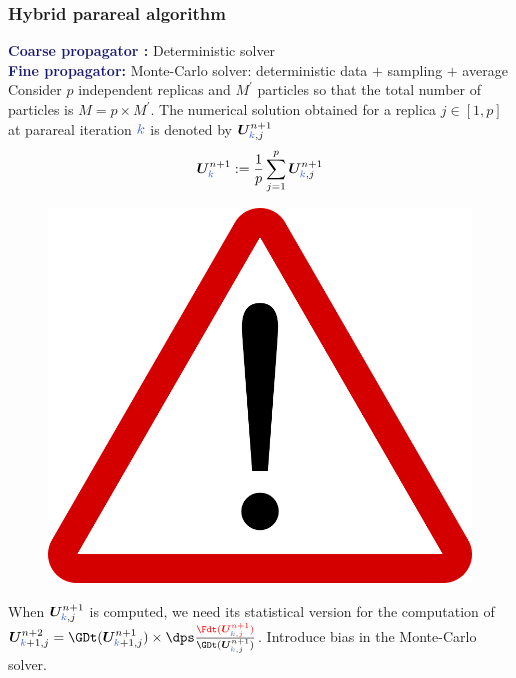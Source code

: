 \documentclass[10 pt]{beamer}
\begin{document}
\begin{frame}
\frametitle{Hybrid parareal algorithm}
\textcolor{midnightblue}{\textbf{Coarse propagator :}} Deterministic solver\\
\vspace*{0.2 cm}
\textcolor{midnightblue}{\textbf{Fine propagator:}} Monte-Carlo solver: deterministic data $+$ sampling $+$ average \\
\vspace*{0.2 cm}
Consider $p$ independent replicas and $M^{\prime}$ particles so that the total number of particles is $M = p \times M^{\prime}$.
The numerical solution obtained for a replica $j \in \left[1, p\right]$ at parareal iteration $\kk$ is denoted by ${\bm U}_{\kk,j}^{n+1}$
\begin{equation*}
{\bm U}_{\kk}^{n+1} := \frac{1}{p} \sum_{j=1}^p {\bm U}_{\kk,j}^{n+1}
\end{equation*}
\begin{minipage}{0.2 \linewidth}
\begin{figure}
\includegraphics[scale=0.04]{image/attention}
\end{figure}
\end{minipage}
\hfill
\begin{minipage}{0.75 \linewidth}
When ${\bm U}_{\kk,j}^{n+1}$ is computed, we need its statistical version for the computation of ${\bm U}_{\kk+1,j}^{n+2} = \GDt({\bm U}_{\kk+1,j}^{n+1}) \times \dps \frac{\textcolor{red}{\Fdt({\bm U}_{\kk,j}^{n+1})}}{\GDt({\bm U}_{\kk,j}^{n+1})}$. Introduce bias in the Monte-Carlo solver.
\end{minipage}
\end{frame}
\end{document}
